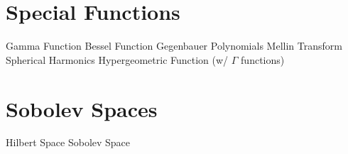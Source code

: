 \documentclass[14pt]{extarticle}
\begin{document}
\begin{outline}
		\section*{Special Functions}
			\1	Gamma Function
			\1	Bessel Function
			\1	Gegenbauer Polynomials
			\1	Mellin Transform
			\1	Spherical Harmonics
			\1	Hypergeometric Function (w/ $\Gamma$ functions)
		\section*{Sobolev Spaces}
			\1	Hilbert Space	
			\1	Sobolev Space
			
	\end{outline}
\end{document}
